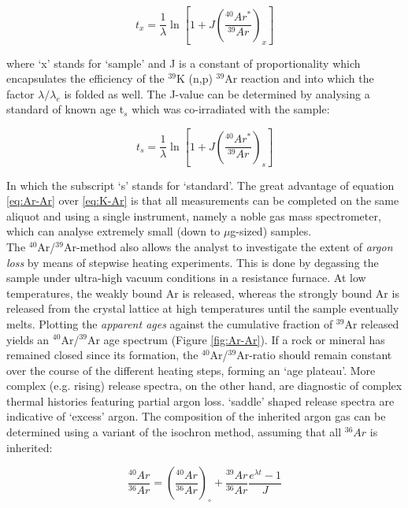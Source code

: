 \documentclass{book}
\begin{document}
\begin{equation}
t_x = \frac{1}{\lambda} \ln\left[
1 + J \left(\frac{^{40}Ar^*}{^{39}Ar}\right)_x 
\right]
\label{eq:Ar-Ar}
\end{equation}

where `x' stands for `sample' and J is a constant of proportionality
which encapsulates the efficiency of the $^{39}$K (n,p) $^{39}$Ar
reaction and into which the factor $\lambda/\lambda_e$ is folded as
well.  The J-value can be determined by analysing a standard of known
age t$_s$ which was co-irradiated with the sample:

\begin{equation}
t_s = \frac{1}{\lambda} \ln\left[
1 + J \left(\frac{^{40}Ar^*}{^{39}Ar}\right)_s 
\right]
\label{eq:J}
\end{equation}

In which the subscript `s' stands for `standard'. The great advantage
of equation \ref{eq:Ar-Ar} over \ref{eq:K-Ar} is that all measurements
can be completed on the same aliquot and using a single instrument,
namely a noble gas mass spectrometer, which can analyse extremely
small (down to $\mu$g-sized) samples.\\

The $^{40}$Ar/$^{39}$Ar-method also allows the analyst to investigate
the extent of \emph{argon loss} by means of stepwise heating
experiments.  This is done by degassing the sample under ultra-high
vacuum conditions in a resistance furnace. At low temperatures, the
weakly bound Ar is released, whereas the strongly bound Ar is released
from the crystal lattice at high temperatures until the sample
eventually melts. Plotting the \emph{apparent ages} against the
cumulative fraction of $^{39}$Ar released yields an
$^{40}$Ar/$^{39}$Ar age spectrum (Figure \ref{fig:Ar-Ar}).  If a rock
or mineral has remained closed since its formation, the
$^{40}$Ar/$^{39}$Ar-ratio should remain constant over the course of
the different heating steps, forming an `age plateau'. More complex
(e.g. rising) release spectra, on the other hand, are diagnostic of
complex thermal histories featuring partial argon loss. `saddle'
shaped release spectra are indicative of `excess' argon. The
composition of the inherited argon gas can be determined using a
variant of the isochron method, assuming that all ${}^{36}Ar$ is
inherited:

\begin{equation}
\frac{{}^{40}Ar}{{}^{36}Ar} =
\left(\frac{{}^{40}Ar}{{}^{36}Ar}\right)_\circ +
\frac{{}^{39}Ar}{{}^{36}Ar}\frac{e^{\lambda t} - 1}{J}
\label{eq:Ar-Ar-isochron}
\end{equation}
\end{document}
